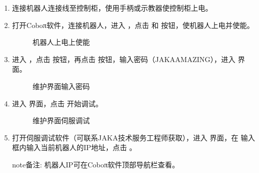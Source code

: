 \documentclass[a4paper,11pt,english,openany,oneside]{sphinxmanual}
\let\sphinxpxdimen\pdfpxdimen\else\newdimen\sphinxpxdimen
\begin{document}
\sphinxAtStartPar
{}
\begin{enumerate}
%
\item {} 
\sphinxAtStartPar
连接机器人连接线至控制柜，使用手柄或示教器使控制柜上电。

\item {} 
\sphinxAtStartPar
打开Coboπ软件，连接机器人，进入 ，点击  和  按钮，使机器人上电并使能。

\begin{figure}[H]
\centering
\capstart

\noindent{}
\caption{机器人上电上使能}\label{\detokenize{_u66f4_u6362_u5173_u8282:id152}}\end{figure}

\item {} 
\sphinxAtStartPar
进入 ，点击 \sphinxincludegraphics[width=18\sphinxpxdimen]{{集合工具包按钮}.png} 按钮，再点击  按钮，输入密码（JAKAAMAZING），进入  界面。

\begin{figure}[H]
\centering
\capstart

\noindent{}
\caption{维护界面\sphinxhyphen{}输入密码}\label{\detokenize{_u66f4_u6362_u5173_u8282:id153}}\end{figure}

\item {} 
\sphinxAtStartPar
进入  界面，点击  开始调试。

\begin{figure}[H]
\centering
\capstart

\noindent{}
\caption{维护界面\sphinxhyphen{}伺服调试}\label{\detokenize{_u66f4_u6362_u5173_u8282:id154}}\end{figure}

\item {} 
\sphinxAtStartPar
打开伺服调试软件（可联系JAKA技术服务工程师获取），进入  界面，在  输入框内输入当前机器人的IP地址，点击 。

\begin{sphinxadmonition}{note}{备注:}
\sphinxAtStartPar
机器人IP可在Coboπ软件顶部导航栏查看。
\end{sphinxadmonition}


\end{enumerate}
\end{document}
